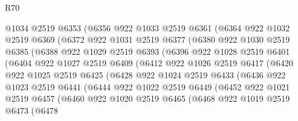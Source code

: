 \begin{lexlean}{R70}
\begin{coremodule}
            @1034
            @2519
            @6353
            (@6356
              @922
              @1033
              @2519
              @6361
              (@6364
                @922
                @1032
                @2519
                @6369
                (@6372
                  @922
                  @1031
                  @2519
                  @6377
                  (@6380
                    @922
                    @1030
                    @2519
                    @6385
                    (@6388
                      @922
                      @1029
                      @2519
                      @6393
                      (@6396
                        @922
                        @1028
                        @2519
                        @6401
                        (@6404
                          @922
                          @1027
                          @2519
                          @6409
                          (@6412
                            @922
                            @1026
                            @2519
                            @6417
                            (@6420
                              @922
                              @1025
                              @2519
                              @6425
                              (@6428
                                @922
                                @1024
                                @2519
                                @6433
                                (@6436
                                  @922
                                  @1023
                                  @2519
                                  @6441
                                  (@6444
                                    @922
                                    @1022
                                    @2519
                                    @6449
                                    (@6452
                                      @922
                                      @1021
                                      @2519
                                      @6457
                                      (@6460
                                        @922
                                        @1020
                                        @2519
                                        @6465
                                        (@6468
                                          @922
                                          @1019
                                          @2519
                                          @6473
                                          (@6478

\end{coremodule}
\end{lexlean}
